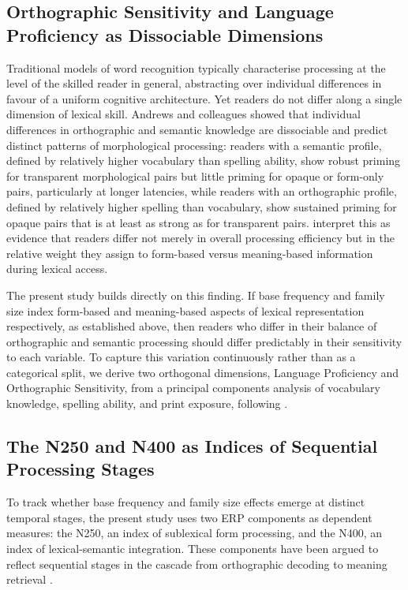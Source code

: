 	\subsection{Orthographic Sensitivity and Language Proficiency as Dissociable Dimensions}

	Traditional models of word recognition typically characterise processing at the level of the skilled reader in general, abstracting over individual differences in favour of a uniform cognitive architecture. Yet readers do not differ along a single dimension of lexical skill. Andrews and colleagues \citep{andrewsIndividualDifferencesSkilled2012, andrewsMorphologicalPrimingStronger2013} showed that individual differences in orthographic and semantic knowledge are dissociable and predict distinct patterns of morphological processing: readers with a semantic profile, defined by relatively higher vocabulary than spelling ability, show robust priming for transparent morphological pairs but little priming for opaque or form-only pairs, particularly at longer latencies, while readers with an orthographic profile, defined by relatively higher spelling than vocabulary, show sustained priming for opaque pairs that is at least as strong as for transparent pairs. \citet{andrewsMorphologicalPrimingStronger2013} interpret this as evidence that readers differ not merely in overall processing efficiency but in the relative weight they assign to form-based versus meaning-based information during lexical access.

	The present study builds directly on this finding. If base frequency and family size index form-based and meaning-based aspects of lexical representation respectively, as established above, then readers who differ in their balance of orthographic and semantic processing should differ predictably in their sensitivity to each variable. To capture this variation continuously rather than as a categorical split, we derive two orthogonal dimensions, Language Proficiency and Orthographic Sensitivity, from a principal components analysis of vocabulary knowledge, spelling ability, and print exposure, following \citet{andrewsMorphologicalPrimingStronger2013}.

	\subsection{The N250 and N400 as Indices of Sequential Processing Stages}

	To track whether base frequency and family size effects emerge at distinct temporal stages, the present study uses two ERP components as dependent measures: the N250, an index of sublexical form processing, and the N400, an index of lexical-semantic integration. These components have been argued to reflect sequential stages in the cascade from orthographic decoding to meaning retrieval \citep{graingerWatchingWordGo2009}.

